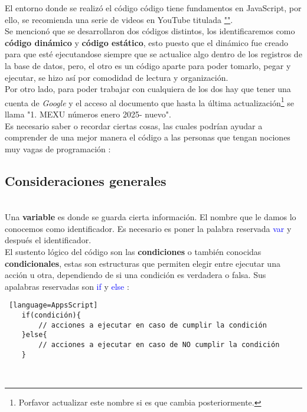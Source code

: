 \documentclass[12pt]{article} %
\begin{document}
    El entorno donde se realizó el código código tiene fundamentos en JavaScript, por ello, se recomienda una serie de videos en YouTube titulada \href{https://www.youtube.com/watch?v=FbNuFsP_k5M}{""}. \\

    Se mencionó que se desarrollaron dos códigos distintos, los identificaremos como \textbf{código dinámico} y \textbf{código estático}, esto puesto que el dinámico fue creado para que esté ejecutandose siempre que se actualice algo dentro de los registros de la base de datos, pero, el otro es un código aparte para poder tomarlo, pegar y ejecutar, se hizo así por comodidad de lectura y organización. \\
    
    Por otro lado, para poder trabajar con cualquiera de los dos hay que tener una cuenta de \textit{Google} y el acceso al documento que hasta la última actualización\footnote{Porfavor actualizar este nombre si es que cambia posteriormente.} se llama "1. MEXU números enero 2025- nuevo". \\

    Es necesario saber o recordar ciertas cosas, las cuales podrían ayudar a comprender de una mejor manera el código a las personas que tengan nociones muy vagas de programación :

    \subsection* {Consideraciones generales}
    \\

    Una \textbf{variable} es donde se guarda cierta información. El nombre que le damos lo conocemos como identificador. Es necesario es poner la palabra reservada \textcolor{blue}{var} y después el identificador. \\

    El sustento lógico del código son las \textbf{condiciones} o también conocidas \textbf{condicionales}, estas son estructuras que permiten elegir entre ejecutar una acción u otra, dependiendo de si una condición es verdadera o falsa. Sus apalabras reservadas son \textcolor{blue}{if} y \textcolor{blue}{else} : \\
    \begin{lstlisting} [language=AppsScript]
    if(condición){
        // acciones a ejecutar en caso de cumplir la condición
    }else{
        // acciones a ejecutar en caso de NO cumplir la condición
    }    
    \end{lstlisting} \\
\end{document}
